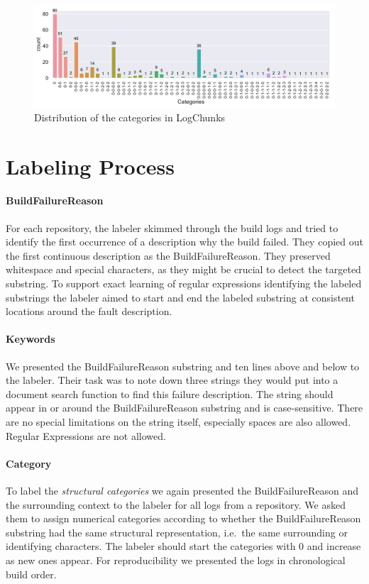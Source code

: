 \documentclass[\myrootdir/main.tex]{subfiles}
\begin{document}
\begin{figure}[htbp]
	\centering
	\includegraphics[width=\textwidth, clip]{img/big-study/categories-dataset.pdf}
	\caption{Distribution of the categories in LogChunks}
	\label{fig:categorycount-examplecount-dataset}
\end{figure}

\section{Labeling Process}
\label{sec:labeling-process}

\paragraph{BuildFailureReason}
For each repository, the labeler skimmed through the build logs and tried to identify the first occurrence of a description why the build failed.
They copied out the first continuous description as the BuildFailureReason.
They preserved whitespace and special characters, as they might be crucial to detect the targeted substring.
To support exact learning of regular expressions identifying the labeled substrings the labeler aimed to start and end the labeled substring at consistent locations around the fault description.

\paragraph{Keywords}
We presented the BuildFailureReason substring and ten lines above and below to the labeler.
Their task was to note down three strings they would put into a document search function to find this failure description.
The string should appear in or around the BuildFailureReason substring and is case-sensitive.
There are no special limitations on the string itself, especially spaces are also allowed.
Regular Expressions are not allowed.

\paragraph{Category}
To label the \emph{structural categories} we again presented the BuildFailureReason and the surrounding context to the labeler for all logs from a repository.
We asked them to assign numerical categories according to whether the BuildFailureReason substring had the same structural representation, i.e.\ the same surrounding or identifying characters.
The labeler should start the categories with 0 and increase as new ones appear.
For reproducibility we presented the logs in chronological build order.
\end{document}
